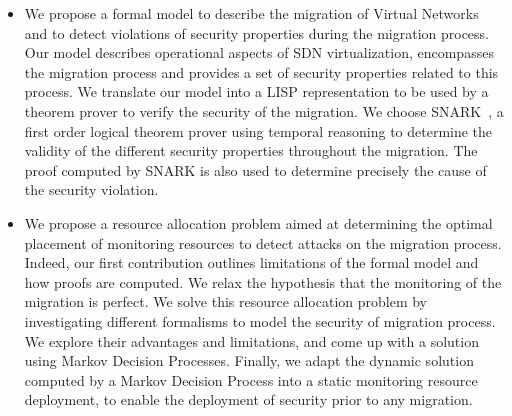 \begin{itemize}
    \item We propose a formal model to describe the migration of Virtual Networks and to detect violations of security properties during the migration process.
    Our model describes operational aspects of SDN virtualization, encompasses the migration process and provides a set of security properties related to this process. We translate our model into a LISP representation to be used by a theorem prover to verify the security of the migration. We choose SNARK~\cite{snark-Stickel2000}, a first order logical theorem prover using temporal reasoning to determine the validity of the different security properties throughout the migration. The proof computed by SNARK is also used to determine precisely the cause of the security violation.
    
    \item  We propose a resource allocation problem aimed at determining the optimal placement of monitoring resources to detect attacks on the migration process. Indeed, our first contribution outlines limitations of the formal model and how proofs are computed. We relax the hypothesis that the monitoring of the migration is perfect. We solve this resource allocation problem by investigating different formalisms to model the security of migration process. We explore their advantages and limitations, and come up with a solution using Markov Decision Processes. Finally, we adapt the dynamic solution computed by a Markov Decision Process into a static monitoring resource deployment, to enable the deployment of security prior to any migration.
\end{itemize}


